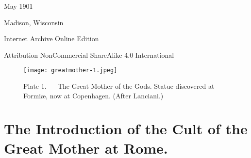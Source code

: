 \documentclass[a4paper, 11pt, oneside, polutonikogreek, english]{article}
\begin{document}
\begin{titlepage}
		
	\vspace*{\fill}%
	
	May 1901  %
	
	{\small Madison, Wisconsin } %

	\vspace{1\baselineskip} %

        Internet Archive Online Edition  %
	
	{\small Attribution NonCommercial ShareAlike 4.0 International } %
\end{titlepage}
\clearpage
\setlength{\parskip}{1mm plus1mm minus1mm}
\tableofcontents
\clearpage
\begin{figure}[H]
\centering
\texttt{[image: greatmother-1.jpeg]}
\caption{Plate 1. --- The Great Mother of the Gods. Statue discovered at Formiæ, now at Copenhagen. (After Lanciani.)}
\end{figure}
\clearpage
\section{The Introduction of the Cult of the Great Mother at Rome.}
\end{document}
